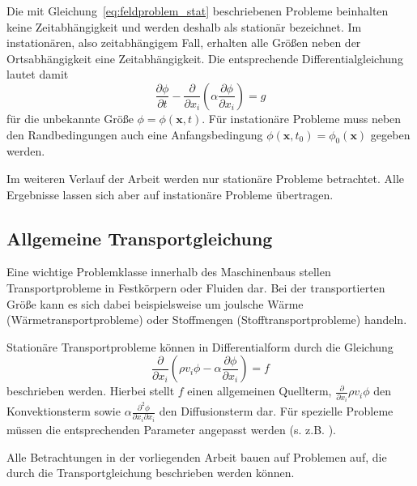 Die mit Gleichung~\eqref{eq:feldproblem_stat} beschriebenen Probleme beinhalten keine Zeitabhängigkeit
und werden deshalb als stationär bezeichnet.
Im instationären, also zeitabhängigem Fall, erhalten alle Größen neben der Ortsabhängigkeit
eine Zeitabhängigkeit. Die entsprechende Differentialgleichung lautet damit
\begin{equation}
  \frac{\partial \phi}{\partial t}
  -\frac{\partial}{\partial x_i}\left({\alpha \frac{\partial \phi}{\partial x_i} }\right)=g
  \label{eq:feldproblem_instat}
\end{equation}
für die unbekannte Größe $\phi=\phi(\mathbf{x}, t)$.
Für instationäre Probleme muss neben den Randbedingungen auch eine Anfangsbedingung
$\phi(\mathbf{x}, t_0) = \phi_0(\mathbf{x})$ gegeben werden.

Im weiteren Verlauf der Arbeit werden nur stationäre Probleme betrachtet. Alle Ergebnisse
lassen sich aber auf instationäre Probleme übertragen.

\subsection{Allgemeine Transportgleichung}

Eine wichtige Problemklasse innerhalb des Maschinenbaus stellen Transportprobleme in
Festkörpern oder Fluiden dar. Bei der transportierten Größe kann es sich dabei beispielsweise
um joulsche Wärme (Wärmetransportprobleme) oder Stoffmengen (Stofftransportprobleme) handeln.

Stationäre Transportprobleme können in Differentialform durch die Gleichung
\begin{equation}
  \frac{\partial}{\partial x_i} \left({\rho v_i \phi
- \alpha \frac{\partial \phi}{\partial x_i} }\right) = f
\end{equation}
beschrieben werden. Hierbei stellt $f$ einen allgemeinen Quellterm,
$\frac{\partial}{\partial x_i} \rho v_i \phi$ den Konvektionsterm sowie
$\alpha \frac{\partial^2 \phi}{\partial x_i \partial x_i}$ den Diffusionsterm dar.
Für spezielle Probleme müssen die entsprechenden Parameter angepasst werden (s. z.B. \cite{num_maschbau}).

Alle Betrachtungen in der vorliegenden Arbeit bauen auf Problemen auf, die durch die
Transportgleichung beschrieben werden können.
